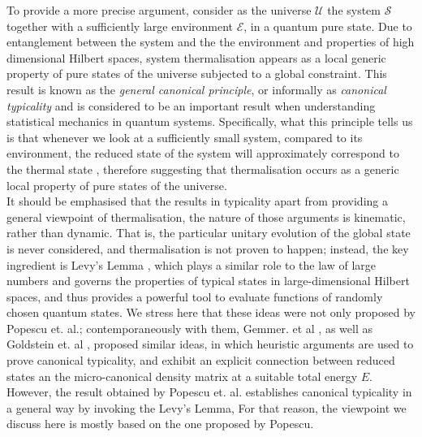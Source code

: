 \indent To provide a more precise argument, consider as the universe $\mathcal{U}$ the system $\mathcal{S}$ together with a sufficiently large environment $\mathcal{E}$, in a quantum pure state. Due to entanglement between the system and the the environment and properties of high dimensional Hilbert spaces, system thermalisation appears as a local generic property of pure states of the universe subjected to a global constraint. This result is known as the \textit{general canonical principle}, or informally as \textit{canonical typicality} and is considered to be an important result when understanding statistical mechanics in quantum systems. Specifically, what this principle tells us is that whenever we look at a sufficiently small system, compared to its environment, the reduced state of the system will approximately correspond to the thermal state \cite{popescu_foundations_2005, popescu_entanglement_2006, goldstein_canonical_2006, gemmer_quantum_2004},  therefore suggesting that thermalisation occurs as a generic local property of pure states of the universe.\\
\indent It should be emphasised that the results in typicality apart from providing a general viewpoint of thermalisation, the nature of those arguments is kinematic, rather than dynamic. That is, the particular unitary evolution of the global state is never considered, and thermalisation is not proven to happen; instead, the key ingredient is Levy's Lemma \cite{milman_asymptotic_2009, ledoux_concentration_2005}, which plays a similar role to the law of large numbers and governs the properties of typical states in large-dimensional Hilbert spaces\cite{popescu_foundations_2005}, and thus provides a powerful tool to evaluate functions of randomly chosen quantum states. We stress here that these ideas were not only proposed by Popescu et. al.; contemporaneously with them,  Gemmer. et al \cite{gemmer_quantum_2004}, as well as Goldstein et. al \cite{goldstein_canonical_2006}, proposed similar ideas, in which heuristic arguments are used to prove canonical typicality, and exhibit an explicit connection between reduced states an the micro-canonical density matrix at a suitable total energy $E$. However, the result obtained by Popescu et. al. establishes canonical typicality in a general way by invoking the Levy's Lemma\cite{popescu_foundations_2005,milman_asymptotic_2009,ledoux_concentration_2005},  For that reason, the viewpoint we discuss here is mostly based on the one proposed by Popescu.\\   
